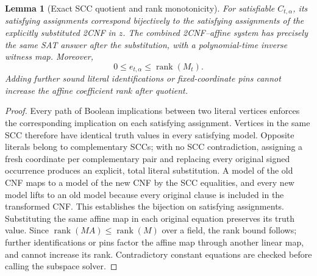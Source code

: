 \documentclass[11pt]{article}
\newtheorem{lemma}[theorem]{Lemma}
\begin{document}
\begin{lemma}[Exact SCC quotient and rank monotonicity]
For satisfiable $C_{t,\alpha}$, its satisfying assignments correspond bijectively to the satisfying assignments of the explicitly substituted 2CNF in $z$. The combined 2CNF--affine system has precisely the same SAT answer after the substitution, with a polynomial-time inverse witness map. Moreover,
\[
0\le e_{t,\alpha}\le\operatorname{rank}(M_t).
\]
Adding further sound literal identifications or fixed-coordinate pins cannot increase the affine coefficient rank after quotient.
\end{lemma}
\begin{proof}
Every path of Boolean implications between two literal vertices enforces the corresponding implication on each satisfying assignment. Vertices in the same SCC therefore have identical truth values in every satisfying model. Opposite literals belong to complementary SCCs; with no SCC contradiction, assigning a fresh coordinate per complementary pair and replacing every original signed occurrence produces an explicit, total literal substitution. A model of the old CNF maps to a model of the new CNF by the SCC equalities, and every new model lifts to an old model because every original clause is included in the transformed CNF. This establishes the bijection on satisfying assignments. Substituting the same affine map in each original equation preserves its truth value. Since $\operatorname{rank}(MA)\le\operatorname{rank}(M)$ over a field, the rank bound follows; further identifications or pins factor the affine map through another linear map, and cannot increase its rank. Contradictory constant equations are checked before calling the subspace solver.
\end{proof}
\end{document}
